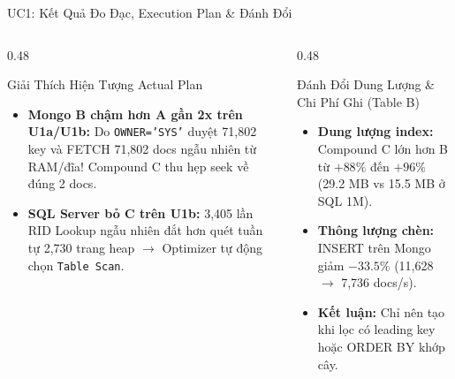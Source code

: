 \documentclass[aspectratio=169,9pt]{beamer}
\begin{document}
\begin{frame}{UC1: Kết Quả Đo Đạc, Execution Plan \& Đánh Đổi}
\vspace{-0.2cm}
\begin{columns}[T]
\begin{column}{0.48\textwidth}
\begin{block}{Giải Thích Hiện Tượng Actual Plan}
\scriptsize
\begin{itemize}
  \item \textbf{Mongo B chậm hơn A gần 2x trên U1a/U1b:} Do \texttt{OWNER='SYS'} duyệt 71,802 key và FETCH 71,802 docs ngẫu nhiên từ RAM/đĩa! Compound C thu hẹp seek về đúng 2 docs.
  \item \textbf{SQL Server bỏ C trên U1b:} 3,405 lần RID Lookup ngẫu nhiên đắt hơn quét tuần tự 2,730 trang heap $\to$ Optimizer tự động chọn \texttt{Table Scan}.
\end{itemize}
\end{block}
\end{column}

\begin{column}{0.48\textwidth}
\begin{alertblock}{Đánh Đổi Dung Lượng \& Chi Phí Ghi (Table B)}
\scriptsize
\begin{itemize}
  \item \textbf{Dung lượng index:} Compound C lớn hơn B từ $+88\%$ đến $+96\%$ (29.2 MB vs 15.5 MB ở SQL 1M).
  \item \textbf{Thông lượng chèn:} INSERT trên Mongo giảm $-33.5\%$ (11,628 $\to$ 7,736 docs/s).
  \item \textbf{Kết luận:} Chỉ nên tạo khi lọc có leading key hoặc ORDER BY khớp cây.
\end{itemize}
\end{alertblock}
\end{column}
\end{columns}
\end{frame}
\end{document}
